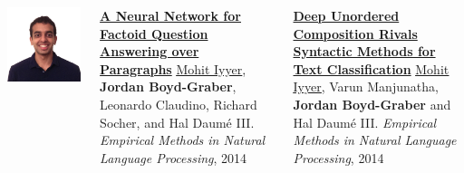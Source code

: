 \documentclass[compress]{beamer}
\begin{document}
\begin{frame}{}

  \begin{columns}
        \includegraphics[width=0.7\linewidth]{general_figures/mohit}
        \begin{block}{ {\bf \href{http://umiacs.umd.edu/~jbg//docs/2014_emnlp_qb_rnn.pdf}{A Neural Network for Factoid Question Answering over Paragraphs}}}
\underline{\href{http://cs.umd.edu/~miyyer/}{Mohit Iyyer}}, {\bf Jordan Boyd-Graber}, Leonardo Claudino, Richard Socher, and Hal {Daum\'{e} III}.  \emph{Empirical Methods in Natural Language Processing}, 2014
        \end{block}

        \begin{block}{ {\bf \href{file:///Users/jbg/public_html/docs/2015_acl_dan.pdf}{Deep Unordered Composition Rivals Syntactic Methods for Text Classification}}}
\underline{\href{http://cs.umd.edu/~miyyer/}{Mohit Iyyer}}, Varun
Manjunatha, {\bf Jordan Boyd-Graber} and Hal {Daum\'{e} III}.  \emph{Empirical Methods in Natural Language Processing}, 2014
        \end{block}

  \end{columns}
\end{frame}
\end{document}
